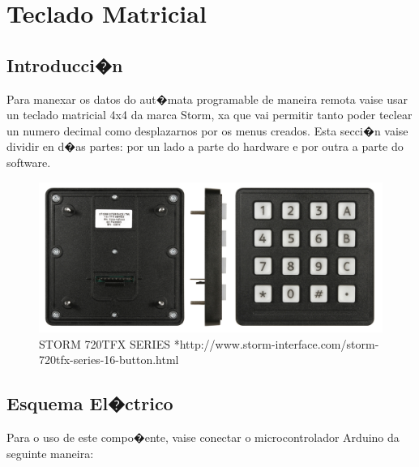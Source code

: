 \documentclass[11pt,twoside]{book}
\begin{document}
\chapter{Teclado Matricial}

\section{Introducci�n}

Para manexar os datos do aut�mata programable de maneira remota vaise usar un teclado matricial 4x4 da marca Storm, xa que vai permitir tanto poder teclear un numero decimal como desplazarnos por os menus creados. Esta secci�n vaise dividir en d�as partes: por un lado a parte do hardware e por outra a parte do software.

\begin{figure}[H]
	\begin{center}
		\includegraphics[width=12cm]{images/teclado_storm.jpg}
	\end{center}
	\caption{STORM 720TFX SERIES *http://www.storm-interface.com/storm-720tfx-series-16-button.html}
	\label{fig:TecladoStorm}
\end{figure}

\section{Esquema El�ctrico}

Para o uso de este compo�ente, vaise conectar o microcontrolador Arduino da seguinte maneira:
\end{document}
